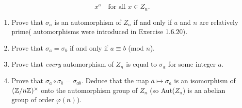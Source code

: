 \begin{enumerate}
$$                  x^a \quad \text{for all } x \in Z_n.$$
                  \begin{enumerate}
                     \item Prove that $\sigma_a$ is an automorphism of $Z_n$ if
                           and only if $a$ and $n$ are relatively prime(
                           automorphisms were introduced in Exercise 1.6.20).
                     \item Prove that $\sigma_a = \sigma_b$ if and only if
                           $a \equiv b$ (mod $n$).
                     \item Prove that \textit{every} automorphism of $Z_n$ is
                           equal to $\sigma_a$ for some integer $a$.
                     \item Prove that $\sigma_a\circ\sigma_b=\sigma_{ab}$.
                           Deduce that the map $\overline{a} \mapsto \sigma_a$
                           is an isomorphism of $(\mathbb{Z}/n\mathbb{Z})^\times$ onto the
                           automorphism group of $Z_n$ (so Aut($Z_n$) is an
                           abelian group of order $\varphi(n)$).
                  \end{enumerate}
\end{enumerate}


































